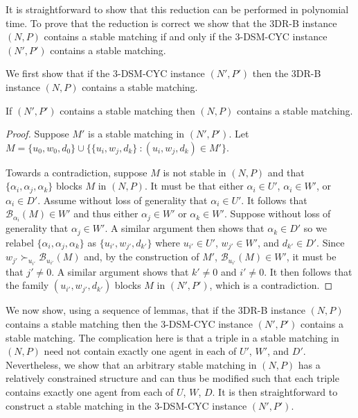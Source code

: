 It is straightforward to show that this reduction can be performed in polynomial time. To prove that the reduction is correct we show that the 3DR-B instance $(N, P)$ contains a stable matching if and only if the 3-DSM-CYC instance $(N', P')$ contains a stable matching.

We first show that if the 3-DSM-CYC instance $(N', P')$ then the 3DR-B instance $(N, P)$ contains a stable matching.

\begin{lem}
\label{lem:threed_sr_b_stablematchinginaqimpliesstablematchinginnp}
If $(N', P')$ contains a stable matching then $(N, P)$ contains a stable matching.
\end{lem}
\begin{proof}
Suppose $M'$ is a stable matching in $(N', P')$. Let $M = \{ u_0, w_0, d_0 \} \cup \{\{ u_i, w_j, d_k \}\ : ( u_i, w_j, d_k )\in M'\}$.
 
Towards a contradiction, suppose $M$ is not stable in $(N, P)$ and that $\{ \alpha_i, \alpha_j, \alpha_k \}$ blocks $M$ in $(N, P)$. It must be that either $\alpha_i \in U'$, $\alpha_i \in W'$, or $\alpha_i \in D'$. Assume without loss of generality that $\alpha_i \in U'$. It follows that $\mathscr{B}_{\alpha_i}(M)\in W'$ and thus either $\alpha_j \in W'$ or $\alpha_k \in W'$. Suppose without loss of generality that $\alpha_j \in W'$. A similar argument then shows that $\alpha_k \in D'$ so we relabel $\{ \alpha_i, \alpha_j, \alpha_k \}$ as $\{ u_{i'}, w_{j'}, d_{k'} \}$ where $u_{i'} \in U'$, $w_{j'} \in W'$, and $d_{k'} \in D'$. Since $w_{j'} \succ_{u_{i'}} \mathscr{B}_{u_{i'}}(M)$ and, by the construction of $M'$, $\mathscr{B}_{u_{i'}}(M) \in W'$, it must be that $j' \neq 0$. A similar argument shows that $k' \neq 0$ and $i' \neq 0$. It then follows that the family $( u_{i'}, w_{j'}, d_{k'} )$ blocks $M$ in $(N', P')$, which is a contradiction.
\end{proof}

We now show, using a sequence of lemmas, that if the 3DR-B instance $(N, P)$ contains a stable matching then the 3-DSM-CYC instance $(N', P')$ contains a stable matching. The complication here is that a triple in a stable matching in $(N, P)$ need not contain exactly one agent in each of $U'$, $W'$, and $D'$. Nevertheless, we show that an arbitrary stable matching in $(N, P)$ has a relatively constrained structure and can thus be modified such that each triple contains exactly one agent from each of $U$, $W$, $D$. It is then straightforward to construct a stable matching in the 3-DSM-CYC instance $(N', P')$.


